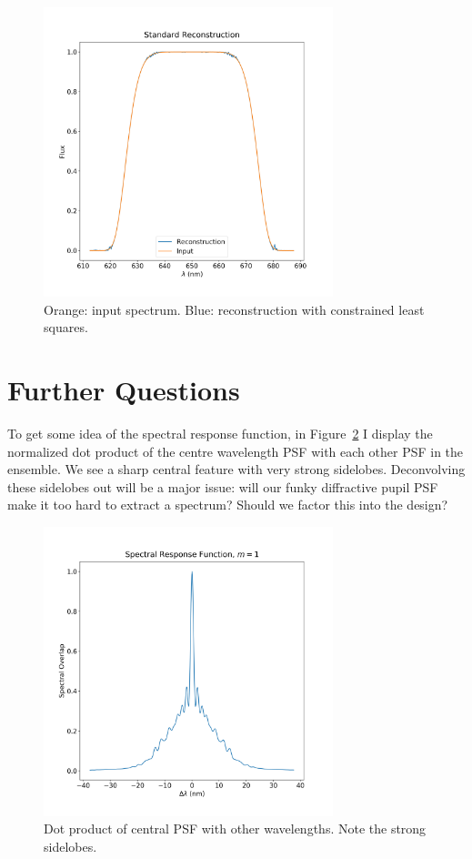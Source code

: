 \documentclass[a4paper,12pt]{article}
\begin{document}
\begin{figure}
\centering
\includegraphics[width=0.75\textwidth]{standard_recon.png}
\caption{Orange: input spectrum. Blue: reconstruction with constrained least squares.}
\label{spectrum}
\end{figure}

\section{Further Questions}

To get some idea of the spectral response function, in Figure~\ref{response} I display the normalized dot product of the centre wavelength PSF with each other PSF in the ensemble. We see a sharp central feature with very strong sidelobes. Deconvolving these sidelobes out will be a major issue: will our funky diffractive pupil PSF make it too hard to extract a spectrum? Should we factor this into the design?

\begin{figure}
\centering
\includegraphics[width=0.75\textwidth]{specresponse.png}
\caption{Dot product of central PSF with other wavelengths. Note the strong sidelobes.}
\label{response}
\end{figure}
\end{document}
